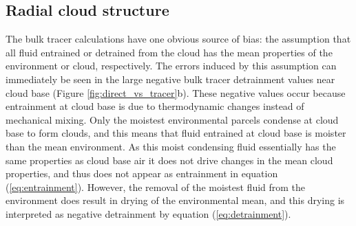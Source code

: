 \documentclass[12pt]{article}
\begin{document}

\subsection{Radial cloud structure}

The bulk tracer calculations have one obvious source of bias: the assumption 
that all fluid entrained or detrained from the cloud has the mean properties of 
the environment or cloud, respectively.  The errors induced by this assumption 
can immediately be seen in the large negative bulk tracer detrainment values 
near cloud base (Figure \ref{fig:direct_vs_tracer}b).  These negative values 
occur because entrainment at cloud base is due to thermodynamic changes instead 
of mechanical mixing.  Only the moistest environmental parcels condense at 
cloud base to form clouds, and this means that fluid entrained at cloud base is 
moister than the mean environment.  As this moist condensing fluid essentially 
has the same properties as cloud base air it does not drive changes in the mean 
cloud properties, and thus does not appear as entrainment in equation 
(\ref{eq:entrainment}).  However, the removal of the moistest fluid from the 
environment does result in drying of the environmental mean, and this drying is 
interpreted as negative detrainment by equation (\ref{eq:detrainment}).
\end{document}
